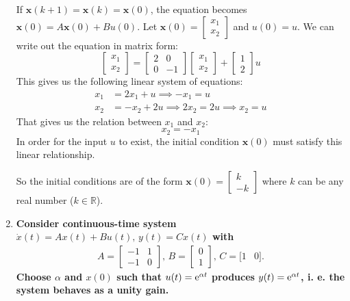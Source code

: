\documentclass[10pt]{article}
\begin{document}
\begin{enumerate}
		If $\mathbf{x}(k+1) = \mathbf{x}(k) = \mathbf{x}(0)$, the equation becomes $\mathbf{x}(0) = A\mathbf{x}(0) + B u(0)$. Let $\mathbf{x}(0) = \begin{bmatrix} x_1 \\ x_2 \end{bmatrix}$ and $u(0)=u$.
		We can write out the equation in matrix form:
		$$
		\begin{bmatrix} x_1 \\ x_2 \end{bmatrix} = \begin{bmatrix} 2 & 0 \\ 0 & -1 \end{bmatrix} \begin{bmatrix} x_1 \\ x_2 \end{bmatrix} + \begin{bmatrix} 1 \\ 2 \end{bmatrix} u
		$$
		This gives us the following linear system of equations:
		\begin{align*}
			x_1 &= 2x_1 + u \implies -x_1 = u \\
			x_2 &= -x_2 + 2u \implies 2x_2 = 2u \implies x_2 = u
		\end{align*}
		That gives us the relation between $x_1$ and $x_2$:
		$$ x_2 = -x_1 $$
		In order for the input $u$ to exist, the initial condition $\mathbf{x}(0)$ must satisfy this linear relationship.
		
		So the initial conditions are of the form $\mathbf{x}(0) = \begin{bmatrix} k \\ -k \end{bmatrix}$ where $k$ can be any real number ($k \in \mathbb{R}$).
		
		\item \textbf{Consider continuous-time system $\dot{x}(t) = Ax(t) + Bu(t),\,y(t) = Cx(t)$ with 
			\begin{eqnarray*}
				A=\begin{bmatrix}
					-1 & 1\\
					-1 & 0
				\end{bmatrix},\,
				B=\begin{bmatrix}
					0\\
					1
				\end{bmatrix},\,
				C = [1 & 0].
			\end{eqnarray*}
			Choose $\alpha$ and $x(0)$ such that $u(t)={\rm e}^{\alpha t}$ produces $y(t) = {\rm e}^{\alpha t}$, i. e. the system behaves as a unity gain.
		}
		

\end{enumerate}
\end{document}

